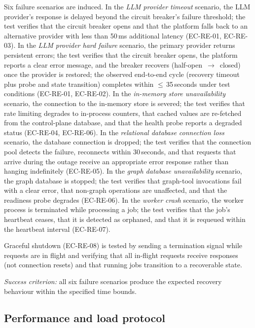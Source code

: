 \documentclass[a4paper]{sapthesis}
\begin{document}
Six failure scenarios are induced.  In the \emph{LLM provider timeout}
scenario, the LLM provider's response is delayed beyond the circuit
breaker's failure threshold; the test verifies that the circuit breaker
opens and that the platform falls back to an alternative provider with
less than 50\,ms additional latency (EC-RE-01, EC-RE-03).  In the
\emph{LLM provider hard failure} scenario, the primary provider returns
persistent errors; the test verifies that the circuit breaker opens, the
platform reports a clear error message, and the breaker recovers
(half-open~$\to$~closed) once the provider is restored; the observed
end-to-end cycle (recovery timeout plus probe and state transition)
completes within $\leq$\,35\,seconds under test conditions
(EC-RE-01, EC-RE-02).  In the \emph{in-memory store
unavailability} scenario, the connection to the in-memory store is
severed; the test verifies that rate limiting degrades to in-process
counters, that cached values are re-fetched from the control-plane
database, and that the health probe reports a degraded status (EC-RE-04,
EC-RE-06).  In the \emph{relational database connection loss} scenario,
the database connection is dropped; the test verifies that the connection
pool detects the failure, reconnects within 30\,seconds, and that
requests that arrive during the outage receive an appropriate error
response rather than hanging indefinitely (EC-RE-05).  In the
\emph{graph database unavailability} scenario, the graph database is
stopped; the test verifies that graph-tool invocations fail with a clear
error, that non-graph operations are unaffected, and that the readiness
probe degrades (EC-RE-06).  In the \emph{worker crash} scenario, the
worker process is terminated while processing a job; the test verifies
that the job's heartbeat ceases, that it is detected as orphaned, and
that it is requeued within the heartbeat interval (EC-RE-07).

Graceful shutdown (EC-RE-08) is tested by sending a termination signal
while requests are in flight and verifying that all in-flight requests
receive responses (not connection resets) and that running jobs transition
to a recoverable state.

\medskip
\noindent\emph{Success criterion:} all six failure scenarios produce the
expected recovery behaviour within the specified time bounds.

\subsection{Performance and load protocol}
\label{sec:performance-protocol}
\end{document}
